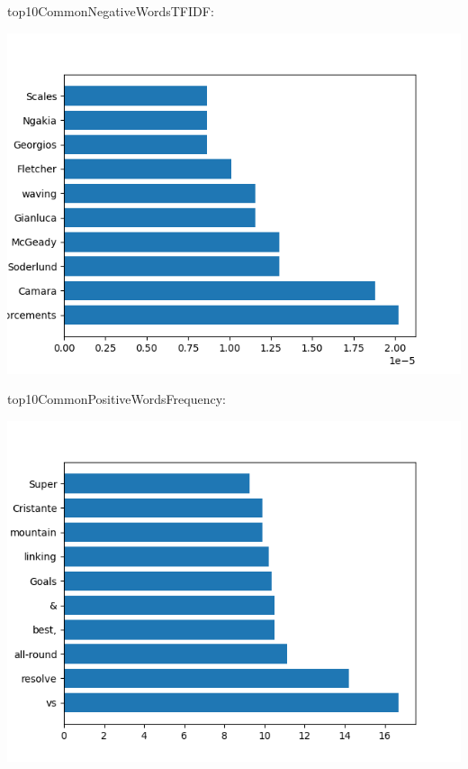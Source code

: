 \documentclass{article}
\begin{document}
top10CommonNegativeWordsTFIDF:
\begin{center}
    \includegraphics{top10CommonNegativeWordsTFIDF}
\end{center}

top10CommonPositiveWordsFrequency:
\begin{center}
    \includegraphics{top10CommonPositiveWordsFrequency}
\end{center}
\end{document}
